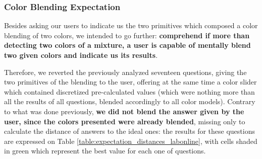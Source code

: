 \subsubsection{Color Blending Expectation}
\label{subsubsec:colorblending_exp}
%
Besides asking our users to indicate us the two primitives which composed a color blending of two colors, we intended to go further: \textbf{comprehend if more than detecting two colors of a mixture, a user
is capable of mentally blend two given colors and indicate us its results}. \par
%
Therefore, we reverted the previously analyzed seventeen questions, giving the two primitives of the blending to the user, offering at the same time a color slider which contained discretized pre-calculated
values (which were nothing more than all the results of all questions, blended accordingly to all color models). Contrary to what was done previously, \textbf{we did not blend the answer given by the user,
since the colors presented were already blended}, missing only to calculate the distance of answers to the ideal ones: the results for these questions are expressed on Table \ref{table:expectation_distances_labonline},
with cells shaded in green which represent the best value for each one of questions. \par
%
